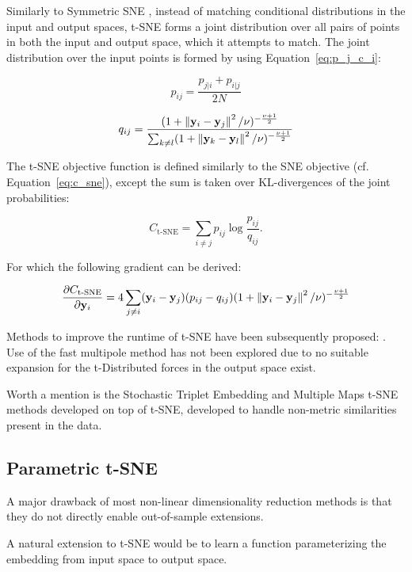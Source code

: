 Similarly to Symmetric SNE \cite{symmetric_sne}, instead of matching conditional distributions in the input and output spaces, t-SNE forms a joint distribution over all pairs of points in both the input and output space, which it attempts to match. The joint distribution over the input points is formed by using Equation~\ref{eq:p_j_c_i}:

$$p_{ij} = \frac{p_{j \vert i} + p_{i \vert j}}{2 N}$$



$$q_{ij} = \frac{(1 + \left\lVert\mathbf{y}_i - \mathbf{y}_j\right\rVert^2 / \nu)^{-\frac{\nu + 1}{2}}}{\sum_{k \neq l} (1 + \left\lVert\mathbf{y}_k - \mathbf{y}_l\right\rVert^2 / \nu)^{-\frac{\nu + 1}{2}}}$$

The t-SNE objective function is defined similarly to the SNE objective (cf. Equation~\ref{eq:c_sne}), except the sum is taken over KL-divergences of the joint probabilities:

$$C_{\text{t-SNE}} = \sum_{i \neq j} p_{ij} \log \frac{p_{ij}}{q_{ij}}.$$

For which the following gradient can be derived:

\begin{equation}
\frac{\partial C_{\text{t-SNE}}}{\partial \mathbf{y}_i} = 4 \sum_{j \neq i} (\mathbf{y}_i - \mathbf{y}_j)(p_{ij} - q_{ij})(1 + \left\lVert\mathbf{y}_i - \mathbf{y}_j\right\rVert^2 / \nu)^{-\frac{\nu + 1}{2}}
\label{eq:c_tsne_grad}
\end{equation}

Methods to improve the runtime of t-SNE have been subsequently proposed: \cite{accelerated_tsne_1, accelerated_tsne_2}. Use of the fast multipole method \cite{fast_multipole} has not been explored due to no suitable expansion for the t-Distributed forces in the output space exist.

Worth a mention is the Stochastic Triplet Embedding \cite{stochastic_triplet_embedding} and Multiple Maps t-SNE \cite{multiple_maps_tsne} methods developed on top of t-SNE, developed to handle non-metric similarities present in the data.

\subsection{Parametric t-SNE}
\label{subsection:parametric_tsne}

A major drawback of most non-linear dimensionality reduction methods is that they do not directly enable out-of-sample extensions.

A natural extension to t-SNE would be to learn a function parameterizing the embedding from input space to output space.

